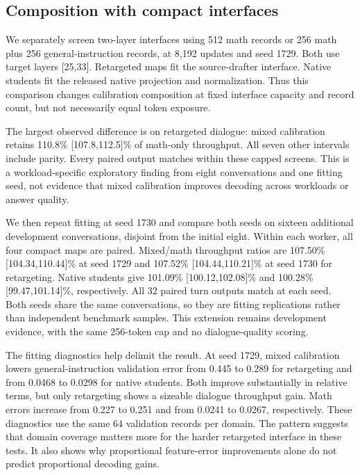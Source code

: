 \documentclass{article}
\begin{document}
\subsection{Composition with compact interfaces}
We separately screen two-layer interfaces using 512 math records or
256 math plus 256 general-instruction records, at 8,192 updates and
seed 1729. Both use target layers [25,33]. Retargeted maps fit the
source-drafter interface. Native students fit the released native
projection and normalization. Thus this comparison changes calibration
composition at fixed interface capacity and record count, but not
necessarily equal token exposure.

The largest observed difference is on retargeted dialogue: mixed
calibration retains 110.8\% [107.8,112.5]\% of math-only throughput.
All seven other intervals include parity. Every paired output matches
within these capped screens. This is a workload-specific exploratory
finding from eight conversations and one fitting seed, not evidence
that mixed calibration improves decoding across workloads or answer quality.

\begin{table}[H]
\caption{Compact-interface calibration composition. Ratios compare
both checkpoints within the same worker. Paired 95\% bootstrap intervals
use requests, or whole conversations for dialogue, and exclude fitting-seed
and selection uncertainty. Code and math screens use 128-token caps.
dialogue uses 256 tokens per turn.}
\label{tab:compact-composition}
\centering\small

\end{table}

We then repeat fitting at seed 1730 and compare both seeds on sixteen
additional development conversations, disjoint from the initial eight.
Within each worker, all four compact maps are paired. Mixed/math
throughput ratios are 107.50\% [104.34,110.44]\% at seed 1729 and
107.52\% [104.44,110.21]\% at seed 1730 for retargeting. Native students
give 101.09\% [100.12,102.08]\% and 100.28\% [99.47,101.14]\%, respectively.
All 32 paired turn outputs match at each seed. Both seeds share the same
conversations, so they are fitting replications rather than independent
benchmark samples. This extension remains development evidence, with
the same 256-token cap and no dialogue-quality scoring.

The fitting diagnostics help delimit the result. At seed 1729, mixed
calibration lowers general-instruction validation error from 0.445 to
0.289 for retargeting and from 0.0468 to 0.0298 for native students.
Both improve substantially in relative terms, but only retargeting shows
a sizeable dialogue throughput gain. Math errors increase from 0.227 to
0.251 and from 0.0241 to 0.0267, respectively. These diagnostics use the
same 64 validation records per domain. The pattern suggests that domain
coverage matters more for the harder retargeted interface in these tests.
It also shows why proportional feature-error improvements alone do not
predict proportional decoding gains.
\end{document}
